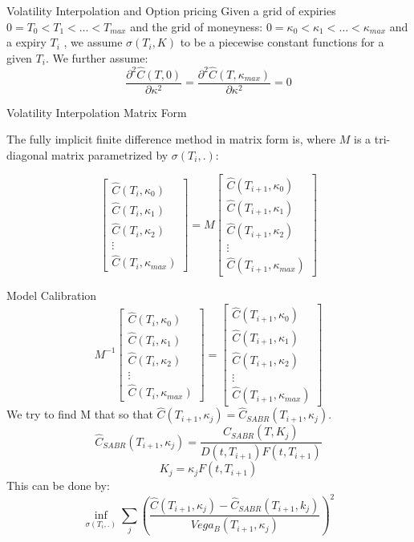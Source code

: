 \documentclass[10pt,table,mathserif]{beamer}
\begin{document}
\begin{frame}{Volatility Interpolation and Option pricing}
Given a grid of expiries $0=T_0 < T_1 < \dots< T_{max} $ and  the grid of moneyness: $0=\kappa_0<\kappa_1<\dots<\kappa_{max}$ and a expiry $T_i$ , we assume $\sigma(T_i,K)$  to be a piecewise constant functions for a given $T_i$. We further assume:
\[
 \frac{\partial^2 \widehat{C}(T,0)}{ \partial \kappa^2}=\frac{\partial^2 \widehat{C}(T,\kappa_{max})}{ \partial \kappa^2}=0
\]
\end{frame}


\begin{frame}{Volatility Interpolation Matrix Form}

The fully implicit finite difference method in matrix form is, where $M$ is a tri-diagonal matrix parametrized by  $\sigma(T_i,.)$:

\[\begin{bmatrix}
\widehat{C}(T_{i},\kappa_0)\\
\widehat{C}(T_{i},\kappa_1)\\
\widehat{C}(T_{i},\kappa_2)\\
\vdots\\
\widehat{C}(T_{i},\kappa_{max})
\end{bmatrix}=M
\begin{bmatrix}
\widehat{C}(T_{i+1},\kappa_0)\\
\widehat{C}(T_{i+1},\kappa_1)\\
\widehat{C}(T_{i+1},\kappa_2)\\
\vdots\\
\widehat{C}(T_{i+1},\kappa_{max})
\end{bmatrix}
\]

\end{frame}


\begin{frame}{Model Calibration}
\[M^{-1} \begin{bmatrix}
\widehat{C}(T_{i},\kappa_0)\\
\widehat{C}(T_{i},\kappa_1)\\
\widehat{C}(T_{i},\kappa_2)\\
\vdots\\
\widehat{C}(T_{i},\kappa_{max})
\end{bmatrix}=
\begin{bmatrix}
\widehat{C}(T_{i+1},\kappa_0)\\
\widehat{C}(T_{i+1},\kappa_1)\\
\widehat{C}(T_{i+1},\kappa_2)\\
\vdots\\
\widehat{C}(T_{i+1},\kappa_{max})
\end{bmatrix}
\]
We try to find M that so that $\widehat{C}(T_{i+1},\kappa_j)=\widehat{C}_{SABR}(T_{i+1},\kappa_j)$.
\[
\widehat{C}_{SABR}(T_{i+1},\kappa_j)=\frac{C_{SABR}(T,K_j)}{D(t,T_{i+1})F(t,T_{i+1})}
\]
\[
K_j=\kappa_j F(t,T_{i+1})
\]
This can be done by:
\[
\inf_{\sigma(T_i,.)} \sum_{j}(\frac{\widehat{C}(T_{i+1},\kappa_j)-\widehat{C}_{SABR}(T_{i+1},k_j)}{Vega_{B}(T_{i+1},\kappa_j)})^2
\]
\end{frame}
\end{document}
